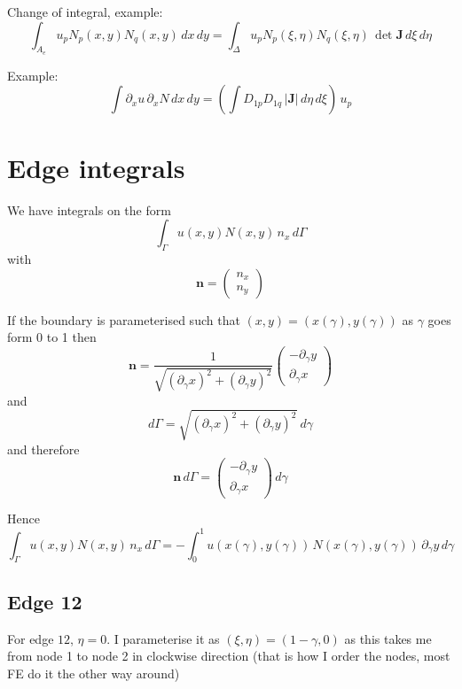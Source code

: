 \documentclass[10pt,a4paper]{book}
\newcommand{\p}{\partial}
\begin{document}
Change of integral, example:
\[
\int_{A_e} u_p N_p(x,y) N_q(x,y) \, dx \, dy=
\int_{\Delta} u_p N_p(\xi,\eta) N_q(\xi,\eta)\, \det \bm{J}  \, d\xi \, d\eta
\]

Example:
\[
\int \p_x u \, \p_x N \, dx \, dy= (\int D_{1p} D_{1q} \, |\bm{J}| \, d\eta \, d\xi )\, 
u_p
\]

\section{Edge integrals}

We have integrals on the form
\[ 
\int_{\Gamma} u(x,y) N(x,y) \, n_x \, d\Gamma
\]
with
\[
\bm{n}=\left ( \begin{array}{c} n_x \\ n_y \end{array} \right )
\]

If the boundary is parameterised such that $(x,y)=(x(\gamma),y(\gamma))$  as $\gamma$ goes form 0 to 1 
then
\[
\bm{n}= \frac{1}{\sqrt{(\p_{\gamma} x)^2 + (\p_{\gamma} y)^2}}
\begin{pmatrix} -\p_{\gamma} y \\ \p_{\gamma} x \end{pmatrix}
\] 
and
\[
d \Gamma= \sqrt{(\p_{\gamma} x)^2 + (\p_{\gamma} y)^2} \ d \gamma
\]
and therefore
\[
\bm{n} \, d \Gamma=  \begin{pmatrix} -\p_{\gamma} y \\ \p_{\gamma} x \end{pmatrix} \, d \gamma
\]

Hence
\[ 
\int_{\Gamma} u(x,y) N(x,y) \, n_x \, d\Gamma= -\int_{0}^{1} u(x(\gamma),y(\gamma)) \, N(x(\gamma),y(\gamma)) \, \p_{\gamma} y \, d \gamma
\]


\subsection{Edge 12}




For edge $12$, $\eta=0$.  I parameterise it as
$(\xi,\eta)=(1-\gamma,0)$ as this takes me from node 1 to node 2 in
clockwise direction (that is how I order the nodes, most FE do it the
other way around)
\end{document}
